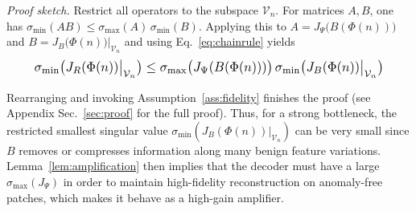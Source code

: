 \documentclass{article}
\theoremstyle{plain}
\theoremstyle{definition}
\theoremstyle{remark}
\begin{document}
\emph{Proof sketch.}
Restrict all operators to the subspace $\mathcal{V}_n$.
For matrices $A,B$, one has $\sigma_{\min}(AB) \le \sigma_{\max}(A)\,\sigma_{\min}(B)$.
Applying this to $A = J_\Psi\big(B(\Phi(n))\big)$ and 
$B = J_B\big(\Phi(n)\big)\big|_{\mathcal{V}_n}$ and using
Eq.~\ref{eq:chainrule}
yields
\begin{equation}
\resizebox{0.9\linewidth}{!}{$
\sigma_{\min}\big(J_R(\Phi(n))\big|_{\mathcal{V}_n}\big)
\le
\sigma_{\max}\big(J_\Psi(B(\Phi(n)))\big)\,
\sigma_{\min}\big(J_B(\Phi(n))\big|_{\mathcal{V}_n}\big)
$}
\end{equation}


Rearranging and invoking Assumption~\ref{ass:fidelity} finishes the proof (see Appendix Sec.~\ref{sec:proof} for the full proof). Thus, for a strong bottleneck, the restricted smallest singular value
$\sigma_{\min}(J_B(\Phi(n))|_{\mathcal{V}_n})$ can be very small since $B$ removes or compresses information along many benign feature variations.
Lemma~\ref{lem:amplification} then implies that the decoder must have a large $\sigma_{\max}(J_\Psi)$ in order to maintain high-fidelity reconstruction on anomaly-free patches, which makes it behave as a high-gain amplifier.



\end{document}
